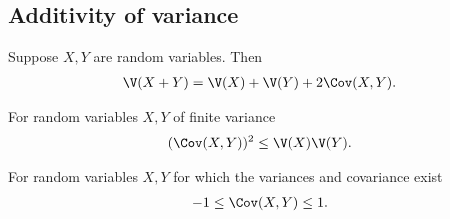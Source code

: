 \documentclass{article}
\begin{document}
\subsection{Additivity of variance}


\begin{theorem}
	Suppose $X,Y$ are random variables. Then
	\begin{align*}
		\V(X+Y)=\V(X)+\V(Y)+2\Cov(X,Y).
	\end{align*}
\end{theorem}
\begin{theorem}
	For random variables $X,Y$ of finite variance
	\begin{align*}
		(\Cov(X,Y))^2\leq \V(X)\V(Y).
	\end{align*}
\end{theorem}
\begin{corollary}
	For random variables $X,Y$ for which the variances and covariance
	exist
	\begin{align*}
		-1 \leq \Cov(X,Y) \leq 1.
	\end{align*}
\end{corollary}
\end{document}
